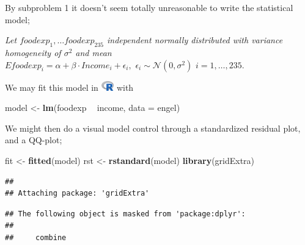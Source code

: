 \documentclass[
]{article}
\newenvironment{Shaded}{\begin{snugshade}}{\end{snugshade}}
\newcommand{\DataTypeTok}[1]{\textcolor[rgb]{0.13,0.29,0.53}{#1}}
\newcommand{\KeywordTok}[1]{\textcolor[rgb]{0.13,0.29,0.53}{\textbf{#1}}}
\newcommand{\NormalTok}[1]{#1}
\newcommand{\OperatorTok}[1]{\textcolor[rgb]{0.81,0.36,0.00}{\textbf{#1}}}
\newcommand{\StringTok}[1]{\textcolor[rgb]{0.31,0.60,0.02}{#1}}
\begin{document}
By subproblem 1 it doesn't seem totally unreasonable to write the
statistical model;

\emph{Let \(foodexp_1,\ldots foodexp_{235}\) independent normally
distributed with variance homogeneity of \(\sigma^2\) and mean
\(Efoodexp_i=\alpha+\beta\cdot Income_i+\epsilon_i,\,\,\epsilon_i\sim\mathcal{N}\left({{0},{\sigma^2}}\right)\,\,i=1,\ldots,235.\)}

We may fit this model in
\includegraphics[width=\textwidth,height=0.16667in]{R_logo.png} with

\begin{Shaded}
\begin{Highlighting}[]
\NormalTok{model <-}\StringTok{ }\KeywordTok{lm}\NormalTok{(foodexp }\OperatorTok{~}\StringTok{ }\NormalTok{income, }\DataTypeTok{data =}\NormalTok{ engel)}
\end{Highlighting}
\end{Shaded}

We might then do a visual model control through a standardized residual
plot, and a QQ-plot;

\begin{Shaded}
\begin{Highlighting}[]
\NormalTok{fit <-}\StringTok{ }\KeywordTok{fitted}\NormalTok{(model)}
\NormalTok{rst <-}\StringTok{ }\KeywordTok{rstandard}\NormalTok{(model)}
\KeywordTok{library}\NormalTok{(gridExtra)}
\end{Highlighting}
\end{Shaded}

\begin{verbatim}
## 
## Attaching package: 'gridExtra'
\end{verbatim}

\begin{verbatim}
## The following object is masked from 'package:dplyr':
## 
##     combine
\end{verbatim}
\end{document}
